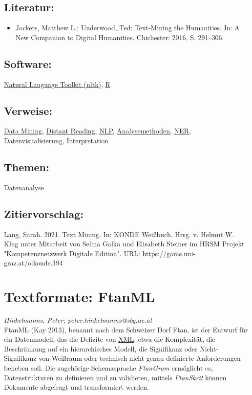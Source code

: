 \documentclass{article}
\begin{document}
        \subsection*{Literatur:}\begin{itemize}\item Jockers, Matthew L.; Underwood, Ted: Text‐Mining the Humanities. In: A New Companion to Digital Humanities. Chichester: 2016, S. 291–306.\end{itemize}\subsection*{Software:}\href{https://www.nltk.org/}{Natural Language Toolkit (nltk)}, \href{https://www.r-project.org}{R}\subsection*{Verweise:}\href{https://gams.uni-graz.at/o:konde.48}{Data Mining}, \href{https://gams.uni-graz.at/o:konde.71}{Distant Reading}, \href{https://gams.uni-graz.at/o:konde.145}{NLP}, \href{https://gams.uni-graz.at/o:konde.16}{Analysemethoden}, \href{https://gams.uni-graz.at/o:konde.141}{NER}, \href{https://gams.uni-graz.at/o:konde.54}{Datenvisualisierung}, \href{https://gams.uni-graz.at/o:konde.100}{Interpretation}\subsection*{Themen:}Datenanalyse\subsection*{Zitiervorschlag:}Lang, Sarah. 2021. Text Mining. In: KONDE Weißbuch. Hrsg. v. Helmut W. Klug unter Mitarbeit von Selina Galka und Elisabeth Steiner im HRSM Projekt "Kompetenznetzwerk Digitale Edition". URL: https://gams.uni-graz.at/o:konde.194\newpage\section*{Textformate: FtanML} \emph{Hinkelmanns, Peter; peter.hinkelmanns@sbg.ac.at }\\
        
    FtanML (Kay 2013), benannt nach dem Schweizer Dorf Ftan, ist der Entwurf für ein Datenmodell, das die Defizite von \href{http://gams.uni-graz.at/o:konde.215}{XML}, etwa die Komplexität, die Beschränkung auf ein hierarchisches Modell, die Signifikanz oder Nicht-Signifikanz von Weißraum oder technisch nicht genau definierte Anforderungen beheben soll. Die zugehörige Schemasprache \emph{FtanGram} ermöglicht es, Datenstrukturen zu definieren und zu validieren, mittels \emph{FtanSkrit} können Dokumente abgefragt und transformiert werden.\\
            
\end{document}
